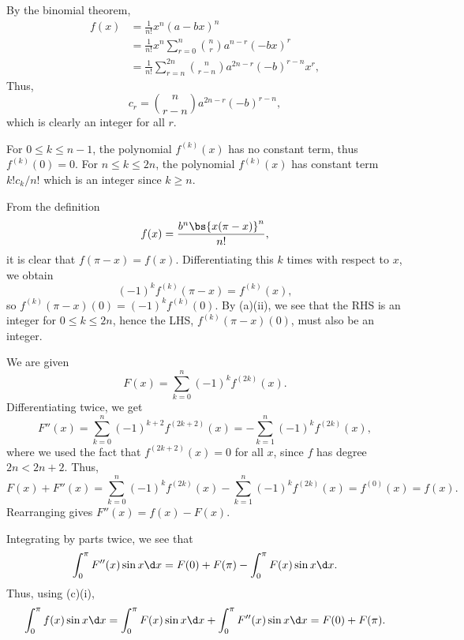 \begin{solution}
    \begin{ppart}
        \begin{psubpart}
            By the binomial theorem,
            \begin{align*}
                f(x) &= \frac{1}{n!} x^n (a-bx)^n\\
                &= \frac1{n!} x^n \sum_{r = 0}^n \binom{n}{r} a^{n-r} (-bx)^r\\
                &= \frac1{n!} \sum_{r = n}^{2n} \binom{n}{r-n} a^{2n-r} (-b)^{r-n} x^{r},
            \end{align*}
            Thus, \[c_r = \binom{n}{r-n} a^{2n-r} (-b)^{r-n},\] which is clearly an integer for all $r$.
        \end{psubpart}
        \begin{psubpart}
            For $0 \leq k \leq n-1$, the polynomial $f^{(k)}(x)$ has no constant term, thus $f^{(k)}(0) = 0$. For $n \leq k \leq 2n$, the polynomial $f^{(k)}(x)$ has constant term $k! c_k / n!$ which is an integer since $k \geq n$.
        \end{psubpart}
    \end{ppart}
    \begin{ppart}
        From the definition \[f(x) = \frac{b^n \bs{x(\pi-x)}^n}{n!},\] it is clear that $f(\pi-x) = f(x)$. Differentiating this $k$ times with respect to $x$, we obtain \[(-1)^k f^{(k)}(\pi-x) = f^{(k)}(x),\] so $f^{(k)}(\pi-x)(0) = (-1)^k f^{(k)}(0)$. By (a)(ii), we see that the RHS is an integer for $0 \leq k \leq 2n$, hence the LHS, $f^{(k)}(\pi-x)(0)$, must also be an integer.
    \end{ppart}
    \begin{ppart}
        \begin{psubpart}
            We are given \[F(x) = \sum_{k = 0}^n (-1)^k f^{(2k)}(x).\] Differentiating twice, we get \[F''(x) = \sum_{k = 0}^{n} (-1)^{k+2} f^{(2k+2)}(x) = -\sum_{k = 1}^{n} (-1)^{k} f^{(2k)}(x),\] where we used the fact that $f^{(2k+2)}(x) = 0$ for all $x$, since $f$ has degree $2n < 2n+2$. Thus, \[F(x) + F''(x) = \sum_{k = 0}^n (-1)^k f^{(2k)}(x) -\sum_{k = 1}^{n} (-1)^{k} f^{(2k)}(x) = f^(0)(x) = f(x).\] Rearranging gives $F''(x) = f(x) - F(x)$.
        \end{psubpart}
        \begin{psubpart}
            Integrating by parts twice, we see that \[\int_0^\pi F''(x) \sin x \d x = F(0) + F(\pi) - \int_0^\pi F(x) \sin x \d x.\] Thus, using (c)(i), \[\int_0^\pi f(x) \sin x \d x = \int_0^\pi F(x) \sin x \d x + \int_0^\pi F''(x) \sin x \d x = F(0) + F(\pi).\]

\end{psubpart}
\end{ppart}
\end{solution}
